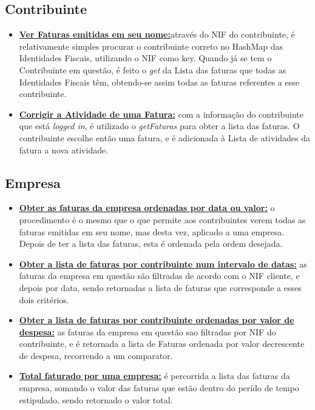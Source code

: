 \subsection{Contribuinte}
\begin{itemize}
\item \textbf{\underline{Ver Faturas emitidas em seu nome:}}através do NIF do contribuinte, é relativamente simples procurar o contribuinte correto no HashMap das Identidades Fiscais, utilizando o NIF como key. Quando já se tem o Contribuinte em questão, é feito o \textit{get} da Lista das faturas que todas as Identidades Fiscais têm, obtendo-se assim todas as faturas referentes a esse contribuinte.
\item \textbf{\underline{Corrigir a Atividade de uma Fatura:}} com a informação do contribuinte que está \textit{logged in}, é utilizado o \textit{getFaturas} para obter a lista das faturas. O contribuinte escolhe então uma fatura, e é adicionada à Lista de atividades da fatura a nova atividade.
\end{itemize}

\subsection{Empresa}
\begin{itemize}
\item \textbf{\underline{Obter as faturas da empresa ordenadas por data ou valor:}} o procedimento é o mesmo que o que permite aos contribuintes verem todas as faturas emitidas em seu nome, mas desta vez, aplicado a uma empresa. Depois de ter a lista das faturas, esta é ordenada pela ordem desejada.
\item \textbf{\underline{Obter a lista de faturas por contribuinte num intervalo de datas:}} as faturas da empresa em questão são filtradas de acordo com o NIF cliente, e depois por data, sendo retornadas a lista de faturas que corresponde a esses dois critérios.
\item \textbf{\underline{Obter a lista de faturas por contribuinte ordenadas por valor de despesa:}} as faturas da empresa em questão sao filtradas por NIF do contribuinte, e é retornada a lista de Faturas ordenada por valor decrescente de despesa, recorrendo a um comparator.
\item \textbf{\underline{Total faturado por uma empresa:}} é percorrida a lista das faturas da empresa, somando o valor das faturas que estão dentro do perído de tempo estipulado, sendo retornado o valor total.
\end{itemize}

